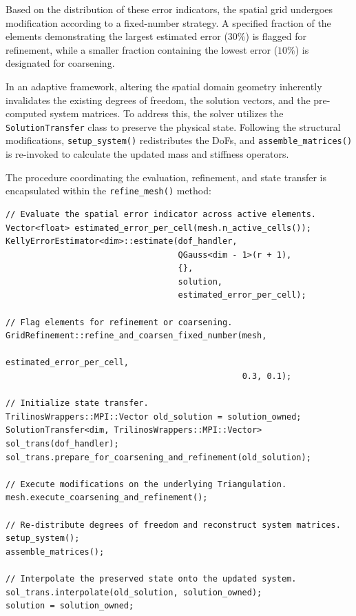 \documentclass[
  11pt,
]{article}
\begin{document}
Based on the distribution of these error indicators, the spatial grid undergoes modification according to a fixed-number strategy. A specified fraction of the elements demonstrating the largest estimated error ($30\%$) is flagged for refinement, while a smaller fraction containing the lowest error ($10\%$) is designated for coarsening.

In an adaptive framework, altering the spatial domain geometry inherently invalidates the existing degrees of freedom, the solution vectors, and the pre-computed system matrices. To address this, the solver utilizes the \texttt{SolutionTransfer} class to preserve the physical state. Following the structural modifications, \texttt{setup\_system()} redistributes the DoFs, and \texttt{assemble\_matrices()} is re-invoked to calculate the updated mass and stiffness operators. 

The procedure coordinating the evaluation, refinement, and state transfer is encapsulated within the \texttt{refine\_mesh()} method:

\begin{verbatim}
// Evaluate the spatial error indicator across active elements.
Vector<float> estimated_error_per_cell(mesh.n_active_cells());
KellyErrorEstimator<dim>::estimate(dof_handler,
                                   QGauss<dim - 1>(r + 1),
                                   {},
                                   solution, 
                                   estimated_error_per_cell);

// Flag elements for refinement or coarsening.
GridRefinement::refine_and_coarsen_fixed_number(mesh, 
                                                estimated_error_per_cell, 
                                                0.3, 0.1);

// Initialize state transfer.
TrilinosWrappers::MPI::Vector old_solution = solution_owned;
SolutionTransfer<dim, TrilinosWrappers::MPI::Vector> sol_trans(dof_handler);
sol_trans.prepare_for_coarsening_and_refinement(old_solution);

// Execute modifications on the underlying Triangulation.
mesh.execute_coarsening_and_refinement();

// Re-distribute degrees of freedom and reconstruct system matrices.
setup_system(); 
assemble_matrices();

// Interpolate the preserved state onto the updated system.
sol_trans.interpolate(old_solution, solution_owned);
solution = solution_owned;
\end{verbatim}
\end{document}
